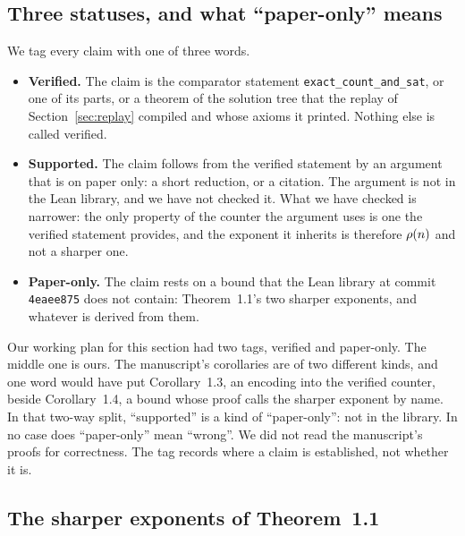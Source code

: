 \subsection{Three statuses, and what ``paper-only'' means}
\label{sec:beyond-statuses}

We tag every claim with one of three words.

\begin{itemize}
\item \textbf{Verified.} The claim is the comparator statement
  \texttt{exact\_count\_and\_sat}, or one of its parts, or a theorem of
  the solution tree that the replay of Section~\ref{sec:replay} compiled
  and whose axioms it printed. Nothing else is called verified.
\item \textbf{Supported.} The claim follows from the verified statement
  by an argument that is on paper only: a short reduction, or a
  citation. The argument is not in the Lean library, and we have not
  checked it. What we have checked is narrower: the only property of
  the counter the argument uses is one the verified statement provides,
  and the exponent it inherits is therefore $\rho(n)$ and not a sharper
  one.
\item \textbf{Paper-only.} The claim rests on a bound that the Lean
  library at commit \texttt{4eaee875} does not contain: Theorem~1.1's
  two sharper exponents, and whatever is derived from them.
\end{itemize}

Our working plan for this section had two tags, verified and paper-only. The
middle one is ours. The manuscript's corollaries are of two different
kinds, and one word would have put Corollary~1.3, an encoding into the
verified counter, beside Corollary~1.4, a bound whose proof calls the
sharper exponent by name. In that two-way split, ``supported'' is
a kind of ``paper-only'': not in the library. In no case does
``paper-only'' mean ``wrong''. We did not read the manuscript's proofs
for correctness. The tag records where a claim is established, not
whether it is.

\subsection{The sharper exponents of Theorem~1.1}
\label{sec:beyond-exponents}


